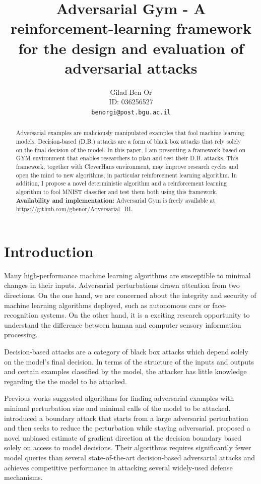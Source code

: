 \documentclass{article}
\title{Adversarial Gym - A reinforcement-learning framework for the design and evaluation of adversarial attacks}
\author{
  Gilad Ben Or\\
  ID: 036256527\\
  \texttt{benorgi@post.bgu.ac.il} \\
  }
\begin{document}
\maketitle

\begin{abstract}
Adversarial examples are maliciously manipulated examples that fool machine learning models. Decision-based (D.B.) attacks are a form of black box attacks that rely solely on the final decision of the model. In this paper, I am presenting a framework based on  GYM environment that enables researchers to plan and test their D.B. attacks. This framework, together with CleverHans environment, may improve research cycles and open the mind to new algorithms, in particular reinforcement learning algorithm.
In addition, I propose a novel deterministic algorithm and a reinforcement learning algorithm to fool MNIST classifier and test them both using this framework.\\
\textbf{Availability and implementation:} Adversarial Gym is freely available at \url{https://github.com/gbenor/Adversarial_RL}
\end{abstract}


\section{Introduction}
Many high-performance machine learning algorithms are susceptible to minimal changes in their inputs. Adversarial perturbations drawn attention from two directions. On the one hand, we are concerned about the integrity and security of machine learning algorithms deployed, such as autonomous cars or face-recognition systems. On the other hand, it is a exciting research opportunity to understand the difference between human and computer sensory information processing.

Decision-based attacks are a category of black box attacks which depend solely on the model's final decision. In terms of the structure of the inputs and outputs and certain examples classified by the model, the attacker has little knowledge regarding the  the model to be attacked.

Previous works suggested algorithms for finding adversarial examples with minimal perturbation size and minimal calls of the model to be attacked. \cite{brendel2017decision} introduced a boundary attack that starts from a large adversarial perturbation and then seeks to reduce the perturbation while staying adversarial. \cite{chen2019hopskipjumpattack} proposed a novel unbiased estimate of gradient direction at the decision boundary based solely on access to model decisions. Their algorithms requires significantly fewer model queries than several state-of-the-art decision-based adversarial attacks and achieves competitive performance in attacking several widely-used defense mechanisms.
\end{document}
